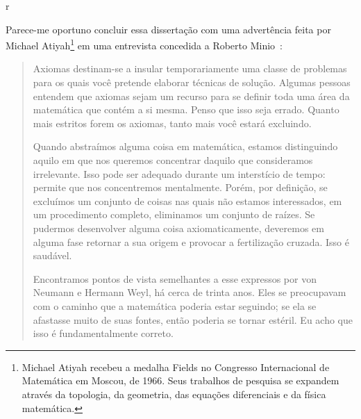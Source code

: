 r\documentclass{hipatia}
\begin{document}
Parece-me oportuno concluir essa dissertação com uma advertência feita por Michael Atiyah\footnote{Michael Atiyah recebeu a medalha Fields no Congresso Internacional de Matemática em Moscou, de 1966. Seus trabalhos de pesquisa se expandem através da topologia, da geometria, das equações diferenciais e da física matemática.
} em uma entrevista concedida a Roberto Minio~\cite[p. 11]{minio1984}:  
\begin{quote}
Axiomas destinam-se a insular temporariamente uma classe de problemas para os quais você pretende elaborar técnicas de solução. Algumas pessoas entendem que axiomas sejam um recurso para se definir toda uma área da matemática que contém a si mesma. Penso que isso seja errado. Quanto mais estritos forem os axiomas, tanto mais você estará excluindo.

Quando abstraímos alguma coisa em matemática, estamos distinguindo aquilo em que nos queremos concentrar daquilo que consideramos irrelevante. Isso pode ser adequado durante um interstício de tempo: permite que nos concentremos mentalmente. Porém, por definição, se excluímos um conjunto de coisas nas quais não estamos interessados, em um procedimento completo, eliminamos um conjunto de raízes. Se pudermos desenvolver alguma coisa axiomaticamente, deveremos em alguma fase retornar a sua origem e provocar a fertilização cruzada. Isso é saudável.

Encontramos pontos de vista semelhantes a esse expressos por von Neumann e Hermann Weyl, há cerca de trinta anos. Eles se preocupavam com o caminho que a matemática poderia
estar seguindo; se ela se afastasse muito de suas fontes, então
poderia se tornar estéril. Eu acho que isso é fundamentalmente correto.
\end{quote}






\nocite{*}




\end{document}
